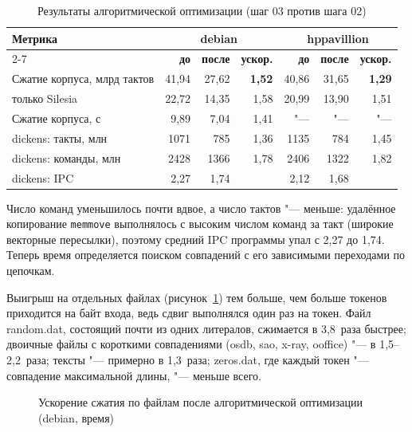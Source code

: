 \begin{table}[H]
\caption{Результаты алгоритмической оптимизации (шаг 03 против шага 02)}
\label{tab:res-14}
\begin{tabletext}
\centering
\begin{tabular}{|l|r|r|r|r|r|r|}
\hline
\multirow{2}{*}{\textbf{Метрика}} & \multicolumn{3}{c|}{\textbf{debian}} & \multicolumn{3}{c|}{\textbf{hppavillion}} \\
\cline{2-7}
 & \textbf{до} & \textbf{после} & \textbf{ускор.} & \textbf{до} & \textbf{после} & \textbf{ускор.} \\
\hline
Сжатие корпуса, млрд тактов & 41,94 & 27,62 & \textbf{1,52} & 40,86 & 31,65 & \textbf{1,29} \\
\quad только Silesia & 22,72 & 14,35 & 1,58 & 20,99 & 13,90 & 1,51 \\
Сжатие корпуса, с & 9,89 & 7,04 & 1,41 & "--- & "--- & "--- \\
dickens: такты, млн & 1071 & 785 & 1,36 & 1135 & 784 & 1,45 \\
dickens: команды, млн & 2428 & 1366 & 1,78 & 2406 & 1322 & 1,82 \\
dickens: IPC & 2,27 & 1,74 & & 2,12 & 1,68 & \\
\hline
\end{tabular}
\end{tabletext}
\end{table}

Число команд уменьшилось почти вдвое, а число тактов "--- меньше: удалённое
копирование \texttt{memmove} выполнялось с высоким числом команд за такт
(широкие векторные пересылки), поэтому средний IPC программы упал с 2,27 до
1,74. Теперь время определяется поиском совпадений с его зависимыми
переходами по цепочкам.

Выигрыш на отдельных файлах (рисунок~\ref{fig:per-file-14}) тем больше, чем
больше токенов приходится на байт входа, ведь сдвиг выполнялся один раз на
токен. Файл random.dat, состоящий почти из одних литералов, сжимается в
3,8~раза быстрее; двоичные файлы с короткими совпадениями (osdb, sao,
x-ray, ooffice) "--- в 1,5--2,2~раза; тексты "--- примерно в 1,3~раза;
zeros.dat, где каждый токен "--- совпадение максимальной длины, "---
меньше всего.

\begin{figure}[H]
\centering
{}
\caption{Ускорение сжатия по файлам после алгоритмической оптимизации (debian, время)}
\label{fig:per-file-14}
\end{figure}

